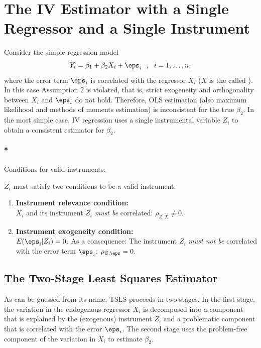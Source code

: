\documentclass[
  letterpaper,
  DIV=11,
  numbers=noendperiod]{scrreprt}
\let\oldparagraph\paragraph
\renewcommand{\paragraph}[1]{\oldparagraph{#1}\mbox{}}
\theoremstyle{definition}
\theoremstyle{plain}
\theoremstyle{plain}
\theoremstyle{remark}
\begin{document}
{\hypertarget{TIVEWASRAASI}{%
\section{The IV Estimator with a Single Regressor and a Single
Instrument}\label{TIVEWASRAASI}}

Consider the simple regression model \begin{align}
  Y_i = \beta_1 + \beta_2 X_i + \eps_i \ \ , \ \ i=1,\dots,n, \label{eq:srm12}
\end{align} where the error term \(\eps_i\) is correlated with the
regressor \(X_i\) (\(X\) is the called ). In
this case Assumption 2 is violated, that is, strict exogeneity and
orthogonality between \(X_i\) and \(\eps_i\) do not hold. Therefore, OLS
estimation (also maximum likelihood and methods of moments estimation)
is inconsistent for the true \(\beta_2\). In the most simple case, IV
regression uses a single instrumental variable \(Z_i\) to obtain a
consistent estimator for \(\beta_2\).

\paragraph*{Conditions for valid instruments:}

\(Z_i\) must satisfy two conditions to be a valid instrument:

\begin{enumerate}
\item \textbf{Instrument relevance condition:}\\
$X_i$ and its instrument $Z_i$ \emph{must be} correlated: $\rho_{Z,X} \neq 0$.
\item \textbf{Instrument exogeneity condition:}\\
$E(\eps_i|Z_i)=0$. As a consequence: The instrument $Z_i$ \emph{must not be} correlated with the error term $\eps_i$: $\rho_{Z,\eps} = 0$.
\end{enumerate}

\hypertarget{the-two-stage-least-squares-estimator}{%
\subsection{The Two-Stage Least Squares
Estimator}\label{the-two-stage-least-squares-estimator}}

As can be guessed from its name, TSLS proceeds in two stages. In the
first stage, the variation in the endogenous regressor \(X_i\) is
decomposed into a  component that is explained by the
(exogenous) instrument \(Z_i\) and a problematic component that is
correlated with the error \(\eps_i\). The second stage uses the
problem-free component of the variation in \(X_i\) to estimate
\(\beta_2\).

}
\end{document}
